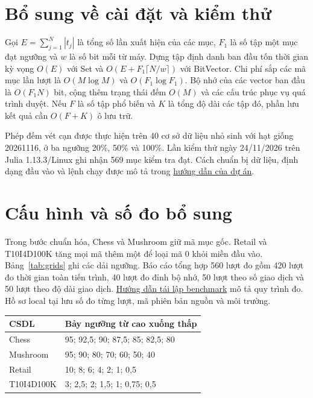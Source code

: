 \documentclass[conference,a4paper]{IEEEtran}
\makeatletter
\newenvironment{reporttable}{\par\medskip\noindent\begin{minipage}{\columnwidth}\def\@captype{table}\centering}{\end{minipage}\par\medskip}
\makeatother
\begin{document}

\appendices
\section{Bổ sung về cài đặt và kiểm thử}
\label{sec:reproduction}
Gọi $E=\sum_{j=1}^{N}|t_j|$ là tổng số lần xuất hiện của các mục,
$F_1$ là số tập một mục đạt ngưỡng và $w$ là số bit mỗi từ máy.
Dựng tập định danh ban đầu tốn thời gian kỳ vọng $O(E)$ với Set
và $O(E+F_1\lceil N/w\rceil)$ với BitVector. Chi phí sắp các mã
mục lần lượt là $O(M\log M)$ và $O(F_1\log F_1)$. Bộ nhớ của
các vector ban đầu là $O(F_1N)$ bit, cộng thêm trạng thái đếm
$O(M)$ và các cấu trúc phục vụ quá trình duyệt. Nếu $F$ là số tập
phổ biến và $K$ là tổng độ dài các tập đó, phần lưu kết quả
cần $O(F+K)$ ô lưu trữ.

Phép đếm vét cạn được thực hiện trên 40 cơ sở dữ liệu nhỏ sinh với
hạt giống 20261116, ở ba ngưỡng 20\%, 50\% và 100\%. Lần kiểm thử
ngày 24/11/2026 trên Julia 1.13.3/Linux ghi nhận 569 mục kiểm tra đạt.
Cách chuẩn bị dữ liệu, định dạng đầu vào và lệnh chạy được mô tả trong
\href{https://github.com/NguyenVoTanDuy2006/DataMining-FIM-Project/blob/master/README.md}{hướng dẫn của dự án}.

\section{Cấu hình và số đo bổ sung}
\label{sec:benchmark-reproduction}
Trong bước chuẩn hóa, Chess và Mushroom giữ mã mục gốc. Retail và
T10I4D100K tăng mọi mã thêm một để loại mã 0 khỏi miền đầu vào.
Bảng~\ref{tab:grids} ghi các dải ngưỡng. Báo cáo tổng hợp 560 lượt đo
gồm 420 lượt đo thời gian toàn tiến trình, 40 lượt đo đỉnh bộ nhớ,
50 lượt theo số giao dịch và 50 lượt theo độ dài giao dịch.
\href{https://github.com/NguyenVoTanDuy2006/DataMining-FIM-Project/blob/master/docs/report_benchmark.md}{Hướng dẫn tái lập benchmark}
mô tả quy trình đo. Hồ sơ local tại 
lưu số đo từng lượt, mã phiên bản nguồn và môi trường.

\begin{reporttable}
\caption{Dải minsup, đơn vị phần trăm; điểm thứ tư dùng cho Peak RSS.}
\label{tab:grids}
\footnotesize
\begin{tabular}{lp{}}\toprule
CSDL & Bảy ngưỡng từ cao xuống thấp\\\midrule
Chess & 95; 92,5; 90; 87,5; 85; 82,5; 80\\
Mushroom & 95; 90; 80; 70; 60; 50; 40\\
Retail & 10; 8; 6; 4; 2; 1; 0,5\\
T10I4D100K & 3; 2,5; 2; 1,5; 1; 0,75; 0,5\\\bottomrule
\end{tabular}
\end{reporttable}
\end{document}
